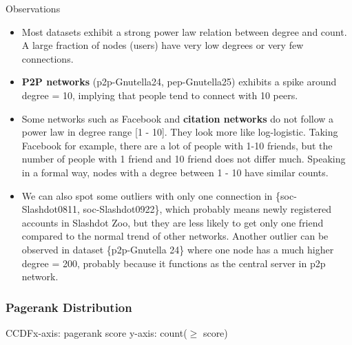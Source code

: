 Observations
\begin{itemize}
\item Most datasets exhibit a strong power law relation between degree and count. A large fraction of nodes (users) have very low degrees or very few connections. 
\item \textbf{P2P networks} (p2p-Gnutella24, pep-Gnutella25) exhibits a spike around degree = 10, implying that people tend to connect with 10 peers.
\item Some networks such as Facebook and \textbf{citation networks} do not follow a power law in degree range [1 - 10]. They look more like log-logistic. Taking Facebook for example, there are a lot of people with 1-10 friends, but the number of people with 1 friend and 10 friend does not differ much. Speaking in a formal way, nodes with a degree between 1 - 10 have similar counts.
\item We can also spot some outliers with only one connection in \{soc-Slashdot0811, soc-Slashdot0922\}, which probably means newly registered accounts in Slashdot Zoo, but they are less likely to get only one friend compared to the normal trend of other networks. Another outlier can be observed in dataset \{p2p-Gnutella 24\} where one node has a much higher degree = 200, probably because it functions as the central server in p2p network.
\end{itemize}

\subsubsection{Pagerank Distribution}

CCDF\quad x-axis: pagerank score \quad y-axis: count($\geq$ score)

